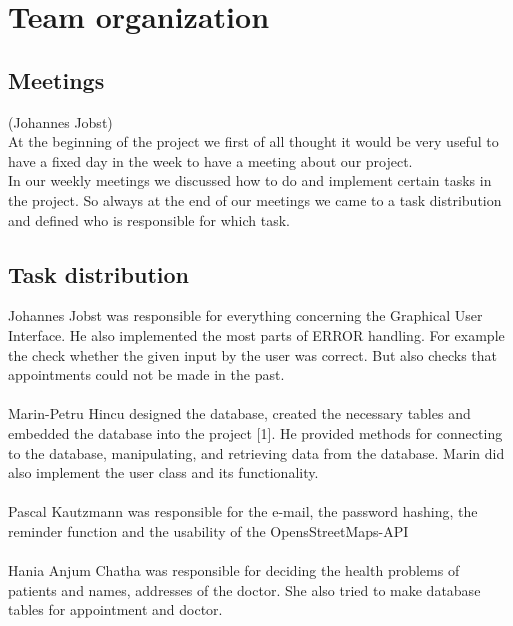 \documentclass[a4paper, 12pt]{report}
\begin{document}
\chapter{Team organization}
\section{Meetings}
{\tiny (Johannes Jobst)\\}
At the beginning of the project we first of all thought it would be very useful 
to have a fixed day in the week to have a meeting about our project. \\
In our weekly meetings we discussed how to do and implement certain tasks in the project.
So always at the end of our meetings we came to a task distribution and defined who is
responsible for which task. 
\section{Task distribution}
Johannes Jobst was responsible for everything concerning the Graphical User Interface.
He also implemented the most parts of ERROR handling. For example the check whether the given
input by the user was correct. But also checks that appointments could not be made in the past. \\ \\
Marin-Petru Hincu designed the database, created the necessary tables and embedded the database into the project [1]. He provided methods for connecting to the database, manipulating, and retrieving data from the database. Marin did also implement the user class and its functionality. \\ \\
Pascal Kautzmann was responsible for the e-mail, the password hashing, the reminder function and the usability of the OpensStreetMaps-API \\ 
	\\
Hania Anjum Chatha was responsible for deciding the health problems of patients and names, addresses of the doctor. She also tried to make database tables for appointment and doctor.
\end{document}
